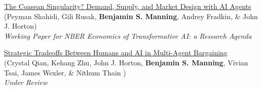 \documentclass[margin,line,pifont,palatino,courier, 9pt]{res}
\begin{document}
\begin{resume}
\href{https://conference.nber.org/conf_papers/f227499.pdf}{The Coasean Singularity? Demand, Supply, and Market Design with AI Agents}\\
(Peyman Shahidi\footnotemark[\value{footnote}], Gili Rusak\footnotemark[\value{footnote}], \textbf{Benjamin S. Manning}\footnotemark[\value{footnote}], Andrey Fradkin\footnotemark[\value{footnote}], \& John J. Horton\footnotemark[\value{footnote}])\\
\textit{Working Paper for NBER Economics of Transformative AI: a Research Agenda}


\href{https://arxiv.org/abs/2509.09071}{Strategic Tradeoffs Between Humans and AI in Multi-Agent Bargaining}\\
(Crystal Qian\footnotemark[\value{footnote}], Kehang Zhu\footnotemark[\value{footnote}],  John J. Horton, \textbf{Benjamin S. Manning}, Vivian Tsai, James Wexler, \& Nithum Thain )\\
\textit{Under Review}


\end{resume}
\end{document}
